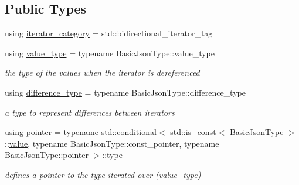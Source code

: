 \subsection*{Public Types}
\begin{DoxyCompactItemize}
\item 
using \hyperlink{classnlohmann_1_1detail_1_1iter__impl_ad9e091f5c70b34b5b1abc1ab15fd9106}{iterator\+\_\+category} = std\+::bidirectional\+\_\+iterator\+\_\+tag
\item 
\mbox{\label{classnlohmann_1_1detail_1_1iter__impl_ab35586a44f2222272c5346baa3013f67}} 
using \hyperlink{classnlohmann_1_1detail_1_1iter__impl_ab35586a44f2222272c5346baa3013f67}{value\+\_\+type} = typename Basic\+Json\+Type\+::value\+\_\+type
\begin{DoxyCompactList}\small\item\em the type of the values when the iterator is dereferenced \end{DoxyCompactList}\item 
\mbox{\label{classnlohmann_1_1detail_1_1iter__impl_a2f7ea9f7022850809c60fc3263775840}} 
using \hyperlink{classnlohmann_1_1detail_1_1iter__impl_a2f7ea9f7022850809c60fc3263775840}{difference\+\_\+type} = typename Basic\+Json\+Type\+::difference\+\_\+type
\begin{DoxyCompactList}\small\item\em a type to represent differences between iterators \end{DoxyCompactList}\item 
\mbox{\label{classnlohmann_1_1detail_1_1iter__impl_a69e52f890ce8c556fd68ce109e24b360}} 
using \hyperlink{classnlohmann_1_1detail_1_1iter__impl_a69e52f890ce8c556fd68ce109e24b360}{pointer} = typename std\+::conditional$<$ std\+::is\+\_\+const$<$ Basic\+Json\+Type $>$\+::\hyperlink{classnlohmann_1_1detail_1_1iter__impl_ab447c50354c6611fa2ae0100ac17845c}{value}, typename Basic\+Json\+Type\+::const\+\_\+pointer, typename Basic\+Json\+Type\+::pointer $>$\+::type
\begin{DoxyCompactList}\small\item\em defines a pointer to the type iterated over (value\+\_\+type) \end{DoxyCompactList}\item 
\mbox{\label{classnlohmann_1_1detail_1_1iter__impl_a5be8001be099c6b82310f4d387b953ce}} 

\end{DoxyCompactItemize}
